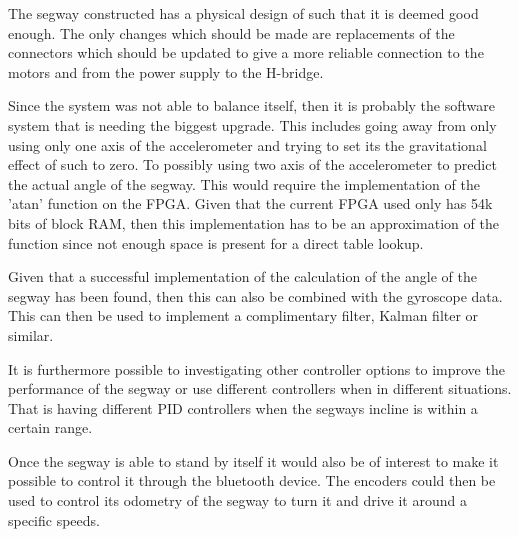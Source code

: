 The segway constructed has a physical design of such that it is deemed good enough.
The only changes which should be made are replacements of the connectors which should be updated to give a more reliable connection to the motors and from the power supply to the H-bridge.

Since the system was not able to balance itself, then it is probably the software system that is needing the biggest upgrade.
This includes going away from only using only one axis of the accelerometer and trying to set its the gravitational effect of such to zero.
To possibly using two axis of the accelerometer to predict the actual angle of the segway.
This would require the implementation of the 'atan' function on the FPGA.
Given that the current FPGA used only has 54k bits of block RAM, then this implementation has to be an approximation of the function since not enough space is present for a direct table lookup.

Given that a successful implementation of the calculation of the angle of the segway has been found, then this can also be combined with the gyroscope data.
This can then be used to implement a complimentary filter, Kalman filter or similar.

It is furthermore possible to investigating other controller options to improve the performance of the segway or use different controllers when in different situations.
That is having different PID controllers when the segways incline is within a certain range.

Once the segway is able to stand by itself it would also be of interest to make it possible to control it through the bluetooth device.
The encoders could then be used to control its odometry of the segway to turn it and drive it around a specific speeds.
